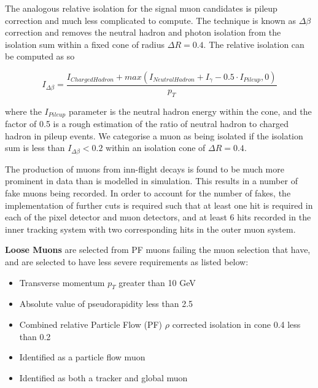 The analogous relative isolation for the signal muon candidates is pileup correction and much less complicated to compute. The technique is known as $\Delta \beta$ correction and removes the neutral hadron and photon isolation from the isolation sum within a fixed cone of radius $\Delta R = 0.4$. The relative isolation can be computed as so 

\begin{equation}
I_{\Delta \beta} = \frac{I_{ChargedHadron} + max\left(I_{NeutralHadron} + I_{\gamma} - 0.5 \cdot I_{Pileup}, 0 \right)}{p_T}
\end{equation}

where the $I_{Pileup}$ parameter is the neutral hadron energy within the cone, and the factor of 0.5 is a rough estimation of the ratio of neutral hadron to charged hadron in pileup events. We categorise a muon as being isolated if the isolation sum is less than $I_{\Delta \beta} < 0.2$ within an isolation cone of $\Delta R = 0.4$. 

The production of muons from inn-flight decays is found to be much more prominent in data than is modelled in simulation. This results in a number of fake muons being recorded. In order to account for the number of fakes, the implementation of further cuts is required such that at least one hit is required in each of the pixel detector and muon detectors, and at least 6 hits recorded in the inner tracking system with two corresponding hits in the outer muon system.  

\textbf{Loose Muons} are selected from PF muons failing the muon selection that have, and are selected to have less severe requirements as listed below:

\begin{itemize}
	\item Transverse momentum $p_T$ greater than 10 GeV
	\item Absolute value of pseudorapidity less than 2.5
	\item Combined relative Particle Flow (PF) $\rho$ corrected isolation in cone 0.4 less than 0.2
	\item Identified as a particle flow muon
	\item Identified as both a tracker and global muon
\end{itemize}

